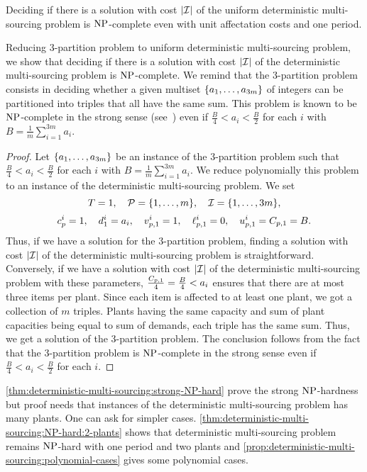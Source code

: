 \begin{thm}\label{thm:deterministic-multi-sourcing:strong-NP-hard}
Deciding if there is a solution with cost $\card{\REF}$ of the uniform deterministic multi-sourcing problem is $\operatorname{NP}$-complete even with unit affectation costs and one period.
\end{thm}


Reducing 3-partition problem to uniform deterministic multi-sourcing problem, we show that deciding if there is a solution with cost $\card{\REF}$ of the deterministic multi-sourcing problem is $\operatorname{NP}$-complete. We remind that the 3-partition problem consists in deciding whether a given multiset $\crbracket{a_1,\ldots,a_{3m}}$ of integers can be partitioned into triples that all have the same sum. This problem is known to be $\operatorname{NP}$-complete in the strong sense (see~\cite{Garey1979}) even if $\frac{B}{4} < a_i < \frac{B}{2}$ for each $i$ with $B=\frac{1}{m}\sum_{i=1}^{3m}a_i$.



\begin{proof}
Let $\crbracket{a_1,\ldots,a_{3m}}$ be an instance of the 3-partition problem such that $\frac{B}{4} < a_i < \frac{B}{2}$ for each $i$ with $B=\frac{1}{m}\sum_{i=1}^{3m}a_i$.
We reduce polynomially this problem to an instance of the deterministic multi-sourcing problem.
We set
$$
  \horizon=1
  ,\quad
  \plants=\range[1]{m}
  ,\quad
  \REF=\range[1]{3m},
$$
$$
  c_p^i=1
  ,\quad
  d_1^i=a_i
  ,\quad
  v_{p,1}^i=1
  ,\quad
  \ell_{p,1}^i=0
  ,\quad
  u_{p,1}^i=C_{p,1}=B.
$$
Thus, if we have a solution for the 3-partition problem, finding a solution with cost $\card{\REF}$ of the deterministic multi-sourcing problem is straightforward.
Conversely, if we have a solution with cost $\card{\REF}$ of the deterministic multi-sourcing problem with these parameters, $\frac{C_{p,1}}{4}=\frac{B}{4} < a_i$ ensures that there are at most three items per plant.
Since each item is affected to at least one plant, we got a collection of $m$ triples.
Plants having the same capacity and sum of plant capacities being equal to sum of demands, each triple has the same sum.
Thus, we get a solution of the 3-partition problem.
The conclusion follows from the fact that the 3-partition problem is $\operatorname{NP}$-complete in the strong sense even if $\frac{B}{4} < a_i < \frac{B}{2}$ for each $i$.
\end{proof}


\cref{thm:deterministic-multi-sourcing:strong-NP-hard} prove the strong $\operatorname{NP}$-hardness but proof needs that instances of the deterministic multi-sourcing problem has many plants.
One can ask for simpler cases.
\cref{thm:deterministic-multi-sourcing:NP-hard:2-plants} shows that deterministic multi-sourcing problem remains $\operatorname{NP}$-hard with one period and two plants and \cref{prop:deterministic-multi-sourcing:polynomial-cases} gives some polynomial cases.


